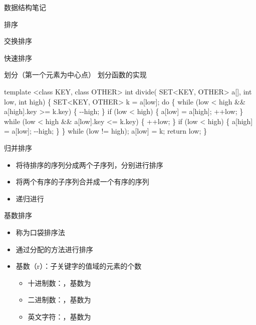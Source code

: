 \documentclass[
  ignorenonframetext,
]{beamer}
\newenvironment{Shaded}{}{}
\newcommand{\NormalTok}[1]{#1}
\providecommand{\tightlist}{%
  \setlength{\itemsep}{0pt}\setlength{\parskip}{0pt}}
\begin{document}
\begin{frame}[fragile]{数据结构笔记}
\begin{block}{排序}
\begin{block}{交换排序}
\begin{block}{快速排序}
\begin{block}{划分（第一个元素为中心点）}
划分函数的实现

\begin{Shaded}
\begin{Highlighting}[]
\NormalTok{template \textless{}class KEY, class OTHER\textgreater{}}
\NormalTok{int divide( SET\textless{}KEY, OTHER\textgreater{} a[], int low, int high)}
\NormalTok{\{}
\NormalTok{  SET\textless{}KEY, OTHER\textgreater{} k = a[low];}
\NormalTok{  do}
\NormalTok{  \{}
\NormalTok{    while (low \textless{} high \&\& a[high].key \textgreater{}= k.key)}
\NormalTok{    \{}
\NormalTok{      {-}{-}high;}
\NormalTok{    \}}
\NormalTok{    if (low \textless{} high)}
\NormalTok{    \{}
\NormalTok{      a[low] = a[high]; ++low;}
\NormalTok{    \}}
\NormalTok{    while (low \textless{} high \&\& a[low].key \textless{}= k.key)}
\NormalTok{    \{}
\NormalTok{      ++low;}
\NormalTok{    \}}
\NormalTok{    if (low \textless{} high)}
\NormalTok{    \{}
\NormalTok{      a[high] = a[low]; {-}{-}high;}
\NormalTok{    \}}
\NormalTok{  \} while (low != high);}
\NormalTok{  a[low] = k;}
\NormalTok{  return low;}
\NormalTok{\}}
\end{Highlighting}
\end{Shaded}
\end{block}
\end{block}
\end{block}

\begin{block}{归并排序}
\protect{}\label{ux5f52ux5e76ux6392ux5e8f}
\begin{itemize}
\tightlist
\item
  将待排序的序列分成两个子序列，分别进行排序
\item
  将两个有序的子序列合并成一个有序的序列
\item
  递归进行
\end{itemize}
\end{block}

\begin{block}{基数排序}
\protect{}\label{ux57faux6570ux6392ux5e8f}
\begin{itemize}
\tightlist
\item
  称为口袋排序法
\item
  通过分配的方法进行排序
\item
  基数（r）：子关键字的值域的元素的个数

  \begin{itemize}
  \tightlist
  \item
    十进制数：{}，基数为 {}
  \item
    二进制数：{}，基数为 {}
  \item
    英文字符：{}，基数为 {}
  \end{itemize}
\end{itemize}


\end{block}
\end{block}
\end{frame}
\end{document}
